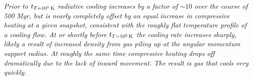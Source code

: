 \documentclass[fleqn,usenatbib]{mnras}
\newcommand{\tcon}{t_{T=10^5\,{\rm K}}}
\newcommand{\Mdot}{\dot{M}}
\newcommand{\nH}{n_{\rm H}}
\begin{document}
\textit{
Prior to $\tcon$ radiative cooling increases by a factor of $\sim 10$ over the course of 500 Myr, but is nearly completely offset by an equal increase in compressive heating at a given snapshot, consistent with the roughly flat temperature profile of a cooling flow.
At or shortly before $\tcon$ the cooling rate increases sharply, likely a result of increased density from gas piling up at the angular momentum support radius.
At roughly the same time compressive heating drops off dramatically due to the lack of inward movement.
The result is gas that cools very quickly.
}


\end{document}
